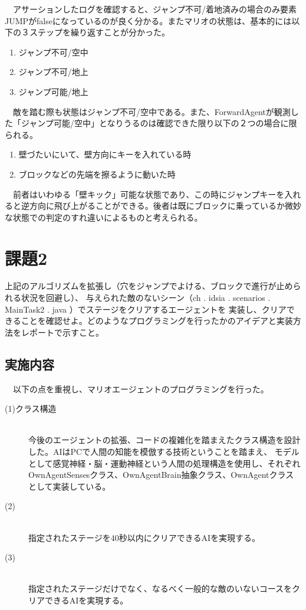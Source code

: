 \documentclass[a4j]{jarticle}
\begin{document}
\begin{description}
　アサーションしたログを確認すると、ジャンプ不可/着地済みの場合のみ要素JUMPがfalseになっているのが良く分かる。またマリオの状態は、基本的には以下の３ステップを繰り返すことが分かった。
\begin{enumerate}
 \item ジャンプ不可/空中
 \item ジャンプ不可/地上
 \item ジャンプ可能/地上
\end{enumerate}
　敵を踏む際も状態はジャンプ不可/空中である。また、ForwardAgentが観測した「ジャンプ可能/空中」となりうるのは確認できた限り以下の２つの場合に限られる。
\begin{enumerate}
 \item 壁づたいにいて、壁方向にキーを入れている時
 \item ブロックなどの先端を擦るように動いた時
\end{enumerate}
　前者はいわゆる「壁キック」可能な状態であり、この時にジャンプキーを入れると逆方向に飛び上がることができる。後者は既にブロックに乗っているか微妙な状態での判定のすれ違いによるものと考えられる。
\end{description}

\newpage

\section{課題2}
  上記のアルゴリズムを拡張し（穴をジャンプでよける、ブロックで進行が止められる状況を回避し）、
与えられた敵のないシーン（ch . idsia . scenarios . MainTask2 . java ）でステージをクリアするエージェントを
実装し、クリアできることを確認せよ。どのようなプログラミングを行ったかのアイデアと実装方法をレポートで示すこと。
\subsection{実施内容}
　以下の点を重視し、マリオエージェントのプログラミングを行った。\\
 \begin{description}
  \item[(1)クラス構造]~\\
  	今後のエージェントの拡張、コードの複雑化を踏まえたクラス構造を設計した。AIはPCで人間の知能を模倣する技術ということを踏まえ、
  	モデルとして感覚神経・脳・運動神経という人間の処理構造を使用し、それぞれOwnAgentSensesクラス、OwnAgentBrain抽象クラス、OwnAgentクラスとして実装している。
  	
  \item[(2)] ~\\
  	指定されたステージを40秒以内にクリアできるAIを実現する。
  \item[(3)]~\\
  	指定されたステージだけでなく、なるべく一般的な敵のいないコースをクリアできるAIを実現する。
 \end{description}
\end{document}
